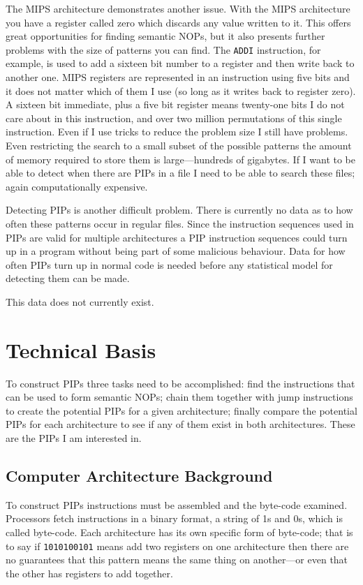 \documentclass[10pt,]{book}
\begin{document}
The MIPS architecture demonstrates another issue. With the MIPS
architecture you have a register called zero which discards any value
written to it. This offers great opportunities for finding semantic
NOPs, but it also presents further problems with the size of patterns
you can find. The \lstinline!ADDI! instruction, for example, is used to
add a sixteen bit number to a register and then write back to another
one. MIPS registers are represented in an instruction using five bits
and it does not matter which of them I use (so long as it writes back to
register zero). A sixteen bit immediate, plus a five bit register means
twenty-one bits I do not care about in this instruction, and over two
million permutations of this single instruction. Even if I use tricks to
reduce the problem size I still have problems. Even restricting the
search to a small subset of the possible patterns the amount of memory
required to store them is large---hundreds of gigabytes. If I want to be
able to detect when there are PIPs in a file I need to be able to search
these files; again computationally expensive.

Detecting PIPs is another difficult problem. There is currently no data
as to how often these patterns occur in regular files. Since the
instruction sequences used in PIPs are valid for multiple architectures
a PIP instruction sequences could turn up in a program without being
part of some malicious behaviour. Data for how often PIPs turn up in
normal code is needed before any statistical model for detecting them
can be made.

This data does not currently exist.

\chapter{Technical Basis}

To construct PIPs three tasks need to be accomplished: find the
instructions that can be used to form semantic NOPs; chain them together
with jump instructions to create the potential PIPs for a given
architecture; finally compare the potential PIPs for each architecture
to see if any of them exist in both architectures. These are the PIPs I
am interested in.

\section{Computer Architecture Background}

To construct PIPs instructions must be assembled and the byte-code
examined. Processors fetch instructions in a binary format, a string of
1s and 0s, which is called byte-code. Each architecture has its own
specific form of byte-code; that is to say if \lstinline!1010100101!
means add two registers on one architecture then there are no guarantees
that this pattern means the same thing on another---or even that the
other has registers to add together.
\end{document}
